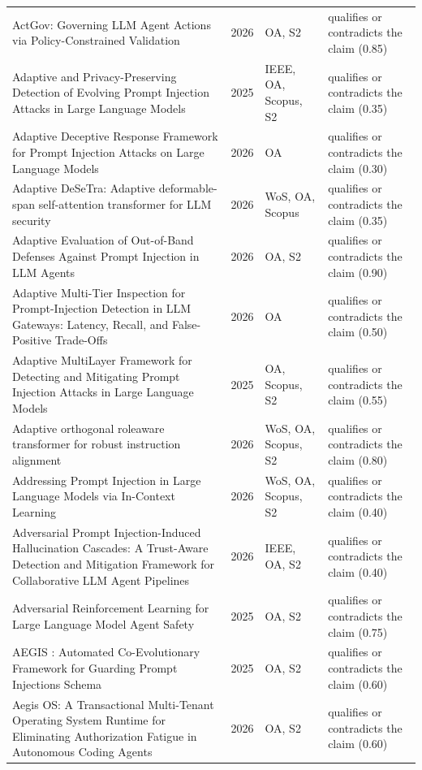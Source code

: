 \begin{longtable}{@{}%
  >{\raggedright\arraybackslash}p{}c%
  >{\raggedright\arraybackslash}p{}%
  >{\raggedright\arraybackslash}p{}@{}}
ActGov: Governing LLM Agent Actions via Policy-Constrained Validation & 2026 & OA, S2 & qualifies or contradicts the claim (0.85) \\
Adaptive and Privacy-Preserving Detection of Evolving Prompt Injection Attacks in Large Language Models & 2025 & IEEE, OA, Scopus, S2 & qualifies or contradicts the claim (0.35) \\
Adaptive Deceptive Response Framework for Prompt Injection Attacks on Large Language Models & 2026 & OA & qualifies or contradicts the claim (0.30) \\
Adaptive DeSeTra: Adaptive deformable-span self-attention transformer for LLM security & 2026 & WoS, OA, Scopus & qualifies or contradicts the claim (0.35) \\
Adaptive Evaluation of Out-of-Band Defenses Against Prompt Injection in LLM Agents & 2026 & OA, S2 & qualifies or contradicts the claim (0.90) \\
Adaptive Multi-Tier Inspection for Prompt-Injection Detection in LLM Gateways: Latency, Recall, and False-Positive Trade-Offs & 2026 & OA & qualifies or contradicts the claim (0.50) \\
Adaptive MultiLayer Framework for Detecting and Mitigating Prompt Injection Attacks in Large Language Models & 2025 & OA, Scopus, S2 & qualifies or contradicts the claim (0.55) \\
Adaptive orthogonal roleaware transformer for robust instruction alignment & 2026 & WoS, OA, Scopus, S2 & qualifies or contradicts the claim (0.80) \\
Addressing Prompt Injection in Large Language Models via In-Context Learning & 2026 & WoS, OA, Scopus, S2 & qualifies or contradicts the claim (0.40) \\
Adversarial Prompt Injection-Induced Hallucination Cascades: A Trust-Aware Detection and Mitigation Framework for Collaborative LLM Agent Pipelines & 2026 & IEEE, OA, S2 & qualifies or contradicts the claim (0.40) \\
Adversarial Reinforcement Learning for Large Language Model Agent Safety & 2025 & OA, S2 & qualifies or contradicts the claim (0.75) \\
AEGIS : Automated Co-Evolutionary Framework for Guarding Prompt Injections Schema & 2025 & OA, S2 & qualifies or contradicts the claim (0.60) \\
Aegis OS: A Transactional Multi-Tenant Operating System Runtime for Eliminating Authorization Fatigue in Autonomous Coding Agents & 2026 & OA, S2 & qualifies or contradicts the claim (0.60) \\

\end{longtable}
